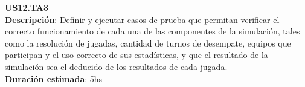 \begin{tcolorbox}
\textbf{US12.TA3} \\
\textbf{Descripción}: Definir y ejecutar casos de prueba que permitan verificar el correcto funcionamiento de cada una de las componentes de la simulación, tales como la resolución de jugadas, cantidad de turnos de desempate, equipos que participan y el uso correcto de sus estadísticas, y que el resultado de la simulación sea el deducido de los resultados de cada jugada.\\
\textbf{Duración estimada}: 5hs
\end{tcolorbox}
\vspace{10pt}

